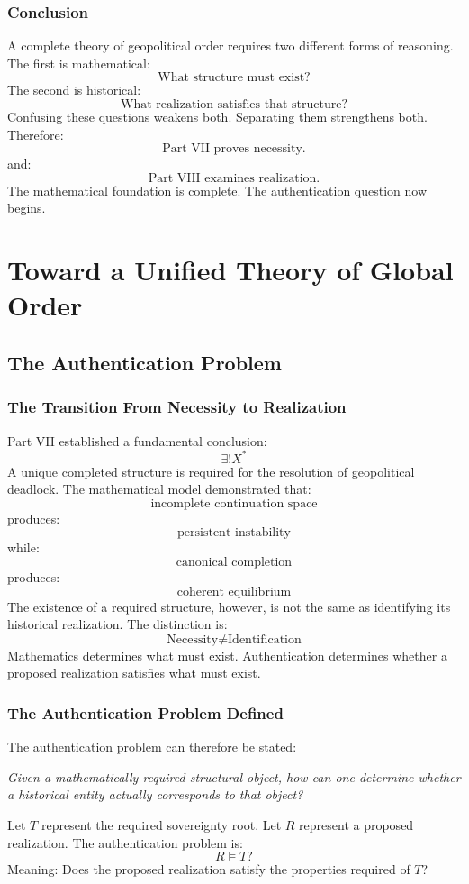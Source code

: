 \documentclass[11pt,openany]{book}
\theoremstyle{plain}
\theoremstyle{definition}
\begin{document}
\section{Conclusion}

A complete theory of geopolitical order requires two different forms of reasoning. The first is mathematical:
\[
\text{What structure must exist?}
\]
The second is historical:
\[
\text{What realization satisfies that structure?}
\]
Confusing these questions weakens both. Separating them strengthens both. Therefore:
\[
\boxed{
\text{Part VII proves necessity.}
}
\]
and:
\[
\boxed{
\text{Part VIII examines realization.}
}
\]
The mathematical foundation is complete. The authentication question now begins.



\part{Toward a Unified Theory of Global Order}


\chapter{The Authentication Problem}

\section{The Transition From Necessity to Realization}

Part VII established a fundamental conclusion:
\[
\exists ! X^*
\]
A unique completed structure is required for the resolution of geopolitical deadlock. The mathematical model demonstrated that:
\[
\text{incomplete continuation space}
\]
produces:
\[
\text{persistent instability}
\]
while:
\[
\text{canonical completion}
\]
produces:
\[
\text{coherent equilibrium}
\]
The existence of a required structure, however, is not the same as identifying its historical realization. The distinction is:
\[
\boxed{
\text{Necessity} \neq \text{Identification}
}
\]
Mathematics determines what must exist. Authentication determines whether a proposed realization satisfies what must exist.

\section{The Authentication Problem Defined}

The authentication problem can therefore be stated:
\begin{center}
\textit{
Given a mathematically required structural object, how can one determine whether a historical entity actually corresponds to that object?
}
\end{center}
Let \(T\) represent the required sovereignty root. Let \(R\) represent a proposed realization. The authentication problem is:
\[
R \models T?
\]
Meaning: Does the proposed realization satisfy the properties required of \(T\)?
\end{document}
